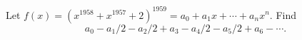 Let $f(x) = \left(x^{1958} + x^{1957} + 2\right)^{1959} = a_0 + a_1x + \cdots + a_nx^n$. Find
\[ a_0 - a_1/2 - a_2/2 + a_3 - a_4/2 - a_5/2 + a_6 - \cdots. \]
